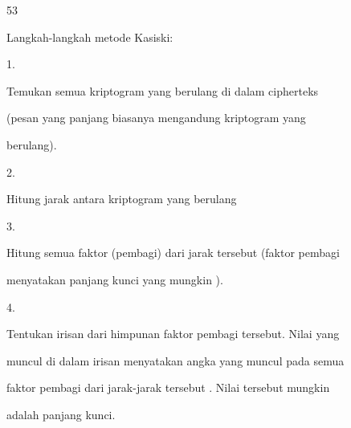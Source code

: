 \documentclass{article}
\begin{document}

53

Langkah-langkah metode Kasiski:

1.

Temukan semua kriptogram yang berulang di dalam cipherteks 

(pesan yang panjang biasanya mengandung kriptogram yang 

berulang). 

2.

Hitung jarak antara kriptogram yang berulang

3.

Hitung semua faktor (pembagi) dari jarak tersebut (faktor pembagi 

menyatakan panjang kunci yang mungkin ).

4.

Tentukan irisan dari himpunan faktor pembagi tersebut. Nilai yang 

muncul di dalam irisan menyatakan angka yang muncul pada semua 

faktor pembagi dari jarak-jarak tersebut . Nilai tersebut mungkin 

adalah panjang kunci.
\end{document}
